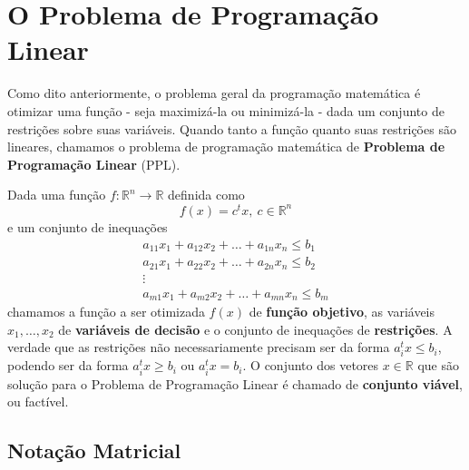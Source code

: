 \section{O Problema de Programação Linear}

Como dito anteriormente, o problema geral da programação matemática é otimizar uma função - seja maximizá-la ou minimizá-la - dada um conjunto de restrições sobre suas variáveis. Quando tanto a função quanto suas restrições são lineares, chamamos o problema de programação matemática de \textbf{Problema de Programação Linear} (PPL). 

Dada uma função $f: \mathbb{R}^n \to \mathbb{R}$ definida como \[f(x) = c^tx,\ c \in \mathbb{R}^n\]e um conjunto de inequações
\begin{gather*}
	a_{11}x_1 + a_{12}x_2 + \ldots + a_{1n}x_n \leq b_1 \\
	a_{21}x_1 + a_{22}x_2 + \ldots + a_{2n}x_n \leq b_2 \\
	\vdots \\
	a_{m1}x_1 + a_{m2}x_2 + \ldots + a_{mn}x_n \leq b_m
\end{gather*} chamamos a função a ser otimizada $f(x)$ de \textbf{função objetivo}, as variáveis $x_1, \ldots, x_2$ de \textbf{variáveis de decisão} e o conjunto de inequações de \textbf{restrições}. A verdade que as restrições não necessariamente precisam ser da forma $a^t_i x \leq b_i$, podendo ser da forma $a^t_i x \geq b_i$ ou  $a^t_i x = b_i$. O conjunto dos vetores $x \in \mathbb{R}$ que são solução para o Problema de Programação Linear é chamado de \textbf{conjunto viável}, ou factível.

\subsection{Notação Matricial}

